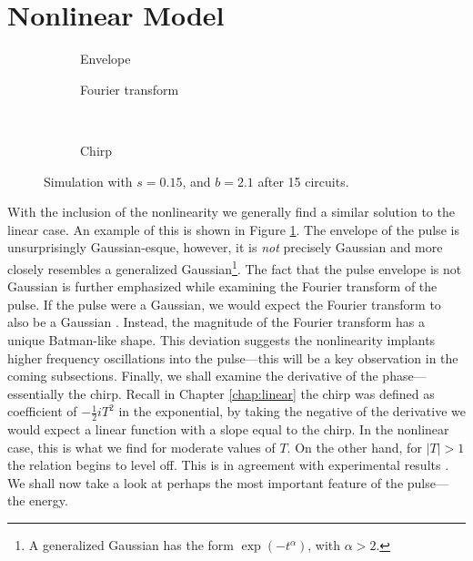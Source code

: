 \section{Nonlinear Model}
\begin{figure}[tbp]
\centering
\begin{subfigure}{0.5\textwidth}
\centering

\caption{Envelope}
\end{subfigure}%
\begin{subfigure}{0.5\textwidth}
\centering

\caption{Fourier transform}
\end{subfigure} \\
\begin{subfigure}{0.5\textwidth}
\centering

\caption{Chirp}
\end{subfigure}
\caption{Simulation with $s = 0.15$, and $b = 2.1$ after 15 circuits.}
\label{fig:nlstable}
\end{figure}
With the inclusion of the nonlinearity we generally find a similar solution to the linear case. An example of this is shown in Figure \ref{fig:nlstable}. The envelope of the pulse is unsurprisingly Gaussian-esque, however, it is \emph{not} precisely Gaussian and more closely resembles a generalized Gaussian\footnote{A generalized Gaussian has the form $\exp \left(-t^\alpha \right)$, with $\alpha > 2$.}. The fact that the pulse envelope is not Gaussian is further emphasized while examining the Fourier transform of the pulse. If the pulse were a Gaussian, we would expect the Fourier transform to also be a Gaussian \cite{debnath, gradshteyn}. Instead, the magnitude of the Fourier transform has a unique Batman-like shape. This deviation suggests the nonlinearity implants higher frequency oscillations into the pulse---this will be a key observation in the coming subsections. Finally, we shall examine the derivative of the phase---essentially the chirp. Recall in Chapter \ref{chap:linear} the chirp was defined as coefficient of $-\frac{1}{2}iT^2$ in the exponential, by taking the negative of the derivative we would expect a linear function with a slope equal to the chirp. In the nonlinear case, this is what we find for moderate values of $T$. On the other hand, for $|T| > 1$ the relation begins to level off. This is in agreement with experimental results \cite{chen, rothenberg, tomlinson}. \\

We shall now take a look at perhaps the most important feature of the pulse---the energy. \\

